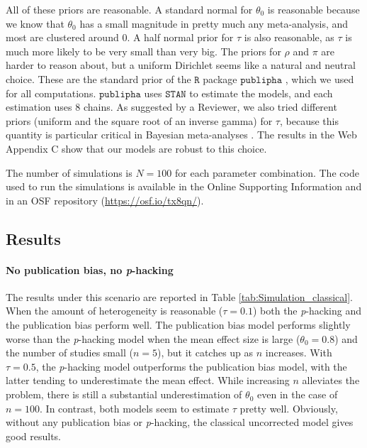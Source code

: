 \documentclass[useAMS,usenatbib,referee]{biom}
\begin{document}
All of these priors are reasonable. A standard normal for $\theta_0$ is reasonable because we know that $\theta_0$ has a small magnitude in pretty much any meta-analysis, and most are clustered around $0$. A half normal prior for $\tau$ is also reasonable, as $\tau$ is much more likely to be very small than very big. The priors for $\rho$ and $\pi$ are harder to reason about, but a uniform Dirichlet seems like a natural and neutral choice. These are the standard prior of the $\mathtt{R}$ package $\mathtt{publipha}$ \citep{publipha}, which we used for all computations. $\mathtt{publipha}$ uses $\mathtt{STAN}$ \citep{Carpenter2017-cf} to estimate the models, and each estimation uses $8$ chains. As suggested by a Reviewer, we also tried different priors (uniform and the square root of an inverse gamma) for $\tau$, because this quantity is particular critical in Bayesian meta-analyses \citep[see, e.g.][]{TurnerAl2012}. The results in the Web Appendix C show that our models are robust to this choice.

The number of simulations is $N = 100$ for each parameter combination. The code used to run the simulations is available in the Online Supporting Information and in an OSF repository (\url{https://osf.io/tx8qn/}).

\subsection{Results}
\paragraph{No publication bias, no \textit{p}-hacking} The results under this scenario are reported in Table \ref{tab:Simulation_classical}. When the amount of heterogeneity is reasonable ($\tau = 0.1$) both the \textit{p}-hacking and the publication bias perform well. The publication bias model performs slightly worse than the \textit{p}-hacking model when the mean effect size is large ($\theta_0 = 0.8$) and the number of studies small ($n=5$), but it catches up as $n$ increases. With $\tau = 0.5$, the \textit{p}-hacking model outperforms the publication bias model, with the latter tending to underestimate the mean effect. While increasing $n$ alleviates the problem, there is still a substantial underestimation of $\theta_0$ even in the case of $n = 100$. In contrast, both models seem to estimate $\tau$ pretty well. Obviously, without any publication bias or \textit{p}-hacking, the classical uncorrected model gives good results.
\end{document}
